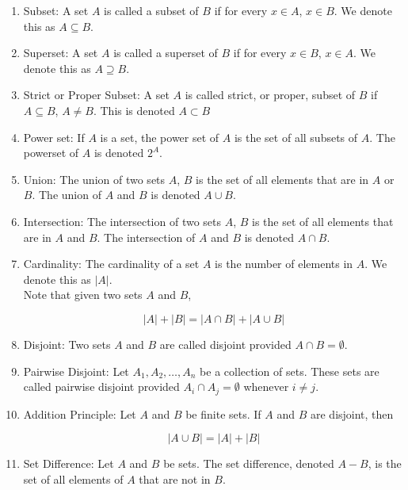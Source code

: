 \documentclass{article}
\begin{document}
\begin{enumerate}
    \item Subset: A set $A$ is called a subset of $B$ if for every $x\in A$, $x\in B$.
    We denote this as $A\subseteq B$.
    
    \item Superset: A set $A$ is called a superset of $B$ if for every $x\in B$, $x\in A$.
    We denote this as $A\supseteq B$.
    
    \item Strict or Proper Subset: A set $A$ is called strict, or proper, subset of $B$ if $A \subseteq B$, $A\neq B$.
    This is denoted $A\subset B$
    
    \item Power set: If $A$ is a set, the power set of $A$ is the set of all subsets of $A$.
    The powerset of $A$ is denoted $2^A$.
    
    \item Union: The union of two sets $A$, $B$ is the set of all elements that are in $A$ or $B$.
    The union of $A$ and $B$ is denoted $A\cup B$.
    
    \item Intersection: The intersection of two sets $A$, $B$ is the set of all elements that are in $A$ and $B$.
    The intersection of $A$ and $B$ is denoted $A\cap B$.
    
    \item Cardinality: The cardinality of a set $A$ is the number of elements in $A$.
    We denote this as $|A|$.\\
    
    Note that given two sets $A$ and $B$, 
    
    \[|A|+|B|=|A\cap B|+|A\cup B|\]
    
    \item Disjoint: Two sets $A$ and $B$ are called disjoint provided $A\cap B=\emptyset$.
    
    \item Pairwise Disjoint: Let $A_1,A_2,\dots,A_n$ be a collection of sets.
    These sets are called pairwise disjoint provided $A_i\cap A_j=\emptyset$ whenever $i\neq j$.
    
    \item Addition Principle: Let $A$ and $B$ be finite sets.
    If $A$ and $B$ are disjoint, then
    
    \[|A\cup B|=|A|+|B|\]
    
    \item Set Difference: Let $A$ and $B$ be sets.
    The set difference, denoted $A-B$, is the set of all elements of $A$ that are not in $B$.
    

\end{enumerate}
\end{document}
